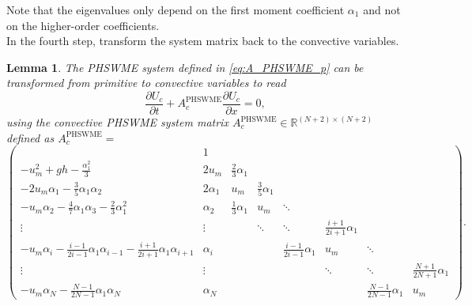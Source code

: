 \documentclass[a4paper, 11pt]{article}
\newtheorem{lemma}{Lemma}
\begin{document}
Note that the eigenvalues only depend on the first moment coefficient $\alpha_1$ and not on the higher-order coefficients.\\

In the fourth step, transform the system matrix back to the convective variables.

\begin{lemma}\label{lemma:APHSWME_c}
    The PHSWME system defined in \eqref{eq:A_PHSWME_p} can be transformed from primitive to convective variables to read
    \begin{equation}\label{eq:PHSWME_c}
        \frac{\partial U_{c}}{\partial t} + A^{\textrm{PHSWME}}_{c} \frac{\partial U_{c}}{\partial x} = 0,
    \end{equation}
    using the convective PHSWME system matrix $A^{\textrm{PHSWME}}_{c} \in \mathbb{R}^{(N+2)\times(N+2)}$ defined as $A^{\textrm{PHSWME}}_{c}=$
    \begin{equation}\label{eq:A_PHSWME_c}
        \left(\begin{array}{cccccccc}
          & 1 &  &  &  &  &  &  \\
        -u_m^2 + gh - \frac{\alpha_1^2}{3} & 2u_m & \frac{2}{3} \alpha_1 &  &  &  &  &  \\
        -2u_m \alpha_1 - \frac{3}{5}\alpha_1\alpha_2 & 2\alpha_1 & u_m & \frac{3}{5} \alpha_1 & &&  &  \\
        -u_m \alpha_2 - \frac{4}{7}\alpha_1\alpha_3 - \frac{2}{3}\alpha_1^2 & \alpha_2 & \frac{1}{3}\alpha_1 & u_m & \ddots & &  &  \\
        \vdots & \vdots &  & \ddots & \ddots & \frac{i+1}{2i+1}\alpha_1 &  &   \\
        -u_m \alpha_i- \frac{i-1}{2i-1}\alpha_1\alpha_{i-1} - \frac{i+1}{2i+1}\alpha_1 \alpha_{i+1}&  \alpha_i &  &  & \frac{i-1}{2i-1}\alpha_1 & u_m & \ddots &  \\
        \vdots & \vdots &  &  &  & \ddots & \ddots &  \frac{N+1}{2N+1}\alpha_1 \\
        -u_m \alpha_N - \frac{N-1}{2N-1} \alpha_1 \alpha_N & \alpha_N &  &  &  &  &  \frac{N-1}{2N-1}\alpha_1 & u_m
        \end{array}\right).
    \end{equation}
\end{lemma}
\end{document}
